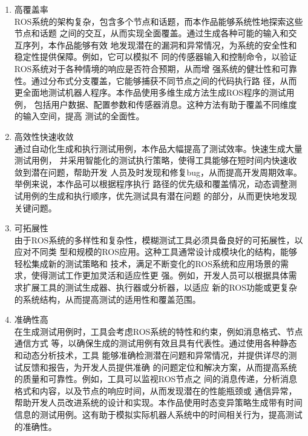 \begin{enumerate}
	\item 高覆盖率 \\
	ROS系统的架构复杂，包含多个节点和话题，而本作品能够系统性地探索这些节点和话题
	之间的交互，从而实现全面覆盖。通过生成各种可能的输入和交互序列，本作品能够有效
	地发现潜在的漏洞和异常情况，为系统的安全性和稳定性提供保障。例如，它可以模拟不
	同的传感器输入和控制命令，以验证ROS系统对于各种情境的响应是否符合预期，从而增
	强系统的健壮性和可靠性。通过分布式分支覆盖，它能够捕获不同节点之间的代码执行路
	径，从而更全面地测试机器人程序。本作品使用多维生成方法生成ROS程序的测试用例，
	包括用户数据、配置参数和传感器消息。这种方法有助于覆盖不同维度的输入空间，提高
	测试的全面性。
	\item 高效性快速收敛 \\
	通过自动化生成和执行测试用例，本作品大幅提高了测试效率。快速生成大量测试用例，
	并采用智能化的测试执行策略，使得工具能够在短时间内快速收敛到潜在问题，帮助开发
	人员及时发现和修复bug，从而提高开发周期效率。举例来说，本作品可以根据程序执行
	路径的优先级和覆盖情况，动态调整测试用例的生成和执行顺序，优先测试具有潜在问题
	的部分，从而更快地发现关键问题。
	\item 可拓展性 \\
	由于ROS系统的多样性和复杂性，模糊测试工具必须具备良好的可拓展性，以应对不同类
	型和规模的ROS应用。这种工具通常设计成模块化的结构，能够轻松集成新的测试策略和
	技术，满足不断变化的ROS系统和应用场景的需求，使得测试工作更加灵活和适应性更
	强。例如，开发人员可以根据具体需求扩展工具的测试生成器、执行器或分析器，以适应
	新的ROS功能或更复杂的系统结构，从而提高测试的适用性和覆盖范围。
	\item 准确性高 \\
	在生成测试用例时，工具会考虑ROS系统的特性和约束，例如消息格式、节点通信方式
	等，以确保生成的测试用例有效且具有代表性。通过使用各种静态和动态分析技术，工具
	能够准确检测潜在问题和异常情况，并提供详尽的测试反馈和报告，为开发人员提供准确
	的问题定位和解决方案，从而提高系统的质量和可靠性。例如，工具可以监视ROS节点之
	间的消息传递，分析消息格式和内容，以及节点的响应时间，从而发现潜在的性能瓶颈或
	通信异常，帮助开发人员改进系统的设计和实现。本作品使用时态变异策略生成带有时间
	信息的测试用例。这有助于模拟实际机器人系统中的时间相关行为，提高测试的准确性。
\end{enumerate}
